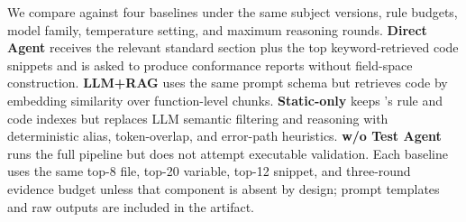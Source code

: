 \begin{table}[t]
\centering
\caption{Protocol implementations used for evaluation.}
\label{tab:protocol-implementations}
\end{table}

We compare \tool{} against four baselines under the same subject versions,
rule budgets, model family, temperature setting, and maximum reasoning rounds.
\textbf{Direct Agent} receives the relevant standard section plus the top
keyword-retrieved code snippets and is asked to produce conformance reports
without field-space construction. \textbf{LLM+RAG} uses the same prompt schema
but retrieves code by embedding similarity over function-level chunks.
\textbf{Static-only} keeps \tool{}'s rule and code indexes but replaces LLM
semantic filtering and reasoning with deterministic alias, token-overlap, and
error-path heuristics. \textbf{w/o Test Agent} runs the full pipeline but does
not attempt executable validation. Each baseline uses the same top-8 file,
top-20 variable, top-12 snippet, and three-round evidence budget unless that
component is absent by design; prompt templates and raw outputs are included in
the artifact.

